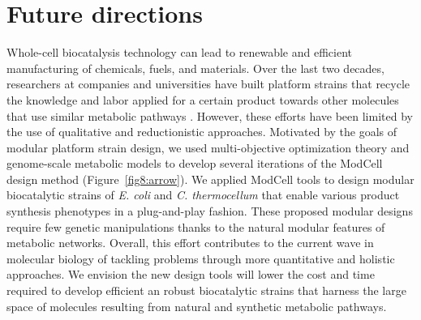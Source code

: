 
\renewcommand{\thefigure}{\roman{figure}} %
\setcounter{figure}{0}

\chapter*{Future directions}\label{ch:conclusion}





Whole-cell biocatalysis technology can lead to renewable and efficient manufacturing of chemicals, fuels, and materials.
Over the last two decades, researchers at companies and universities have built platform strains that recycle the knowledge and labor applied for a certain product towards other molecules that use similar metabolic pathways \citep{nielsen2016}.
However, these efforts have been limited by the use of qualitative and reductionistic approaches.
Motivated by the goals of modular platform strain design, we used multi-objective optimization theory and  genome-scale metabolic models to develop several iterations of the ModCell design method (Figure~\ref{fig8:arrow}).
We applied ModCell tools to design modular biocatalytic strains of \textit{E. coli} and \textit{C. thermocellum} that enable various product synthesis phenotypes in a plug-and-play fashion.
These proposed modular designs require few genetic manipulations thanks to the natural modular features of metabolic networks.
Overall, this effort contributes to the current wave in molecular biology of tackling problems through more quantitative and holistic approaches.
We envision the new design tools will lower the cost and time required to develop efficient an robust biocatalytic strains that harness the large space of molecules resulting from natural and synthetic metabolic pathways.

